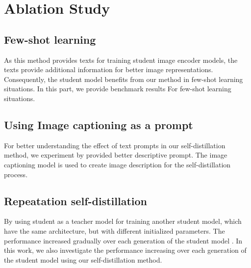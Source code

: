 \section{Ablation Study}
\subsection{Few-shot learning}
As this method provides texts for training student image encoder models, the texts provide additional information for better image representations.
Consequently, the student model benefits from our method in few-shot learning situations.
In this part, we provide benchmark results For few-shot learning situations.

\subsection{Using Image captioning as a prompt}
For better understanding the effect of text prompts in our self-distillation method, we experiment by provided better descriptive prompt.
The image captioning model is used to create image description for the self-distillation process.

\subsection{Repeatation self-distillation}
By using student as a teacher model for training another student model, which have the same architecture, but with different initialized parameters.
The performance increased gradually over each generation of the student model .
In this work, we also investigate the performance increasing over each generation of the student model using our self-distillation method.


